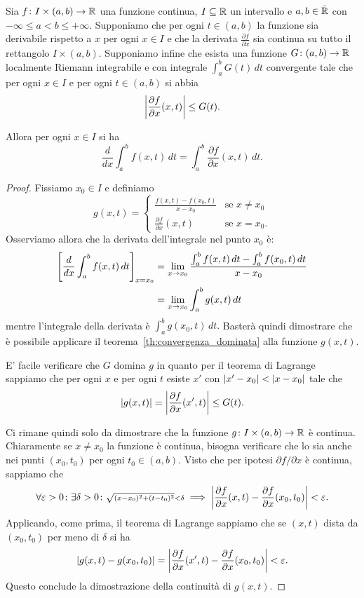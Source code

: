 \begin{theorem}%
  \mymark{**}%
  \label{th:derivata_integrale}%
%
Sia $f\colon I\times(a,b)\to {\mathbb R}$ una funzione continua, 
$I\subseteq {\mathbb R}$ un intervallo e $a,b\in \bar{{\mathbb R}}$ con $-\infty \le a < b \le +\infty$.
Supponiamo che per ogni $t\in (a,b)$ la funzione sia derivabile rispetto a $x$
per ogni $x\in I$
e che la derivata $\frac{\partial f}{\partial x}$ sia continua su tutto il rettangolo 
$I\times(a,b)$.
Supponiamo infine che esista una funzione $G\colon(a,b)\to {\mathbb R}$ localmente Riemann integrabile 
e con integrale $\int_a^b G(t)\, dt$ convergente tale che per ogni $x\in I$ 
e per ogni $t\in (a,b)$ si abbia 
\[
  {\left|\frac{\partial f}{\partial x}(x,t)\right|} \le G(t).
\]

Allora per ogni $x\in I$ si ha
\[
  \frac{d}{dx} \int_a^b f(x,t)\, dt = \int_a^b \frac{\partial f}{\partial x}(x,t)\, dt.  
\]
\end{theorem}
%
\begin{proof}
Fissiamo $x_0\in I$ e definiamo 
\[
 g(x,t) = \begin{cases}
 \frac{f(x,t) - f(x_0,t)}{x-x_0} &\text{se $x\neq x_0$}\\
 \frac{\partial f}{\partial x}(x,t) & \text{se $x = x_0$}.
\end{cases}  
\]
Osserviamo allora che la derivata dell'integrale nel punto $x_0$ 
è:
\begin{align*}
    {\left[ \frac{d}{dx} \int_a^b f(x,t)\, dt \right]}_{x=x_0}
  &= \lim_{x\to x_0} \frac{\int_a^b f(x,t)\, dt - \int_a^b f(x_0,t)\, dt }{x-x_0}\\
  &= \lim_{x\to x_0} \int_a^b g(x,t)\, dt  
\end{align*}
mentre l'integrale della derivata è 
$\int_a^b g(x_0,t)\, dt.$
Basterà quindi dimostrare che è possibile applicare il teorema~\ref{th:convergenza_dominata}
alla funzione $g(x,t)$.

E' facile verificare che $G$ domina $g$ in quanto per il teorema di Lagrange sappiamo 
che per ogni $x$ e per ogni $t$ esiste $x'$ con ${\left|x'-x_0\right|}<{\left|x-x_0\right|}$ tale che 
\[
  {\left|g(x,t)\right|} = {\left|\frac{\partial f}{\partial x}(x',t)\right|} \le G(t).
\]

Ci rimane quindi solo da dimostrare che la funzione $g\colon I\times (a,b)\to {\mathbb R}$ 
è continua. 
Chiaramente se $x\neq x_0$ la funzione è continua, bisogna verificare che lo 
sia anche nei punti $(x_0,t_0)$ per ogni $t_0\in (a,b)$. 
Visto che per ipotesi $\partial f / \partial x$ è continua, sappiamo 
che 
\[
  \forall \varepsilon>0 \colon \exists \delta>0\colon 
  {\scriptstyle\sqrt{(x-x_0)^2+(t-t_0)^2}<\delta} 
  \implies {\left|\frac{\partial f}{\partial x}(x,t) - \frac{\partial f}{\partial x}(x_0,t_0)\right|}<\varepsilon.
\]
Applicando, come prima, il teorema di Lagrange sappiamo che se $(x,t)$ dista da $(x_0,t_0)$
per meno di $\delta$ si ha 
\[
{\left|g(x,t) - g(x_0,t_0)\right|} 
= {\left|\frac{\partial f}{\partial x}(x',t) - \frac{\partial f}{\partial x}(x_0,t_0)\right|}
 < \varepsilon.
\]
Questo conclude la dimostrazione della continuità di $g(x,t)$.
\end{proof}

